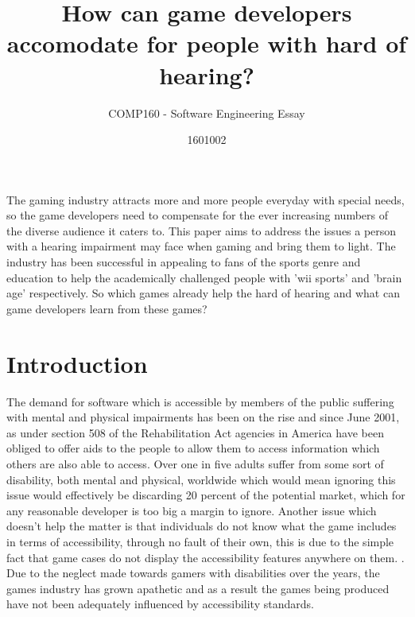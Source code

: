 \documentclass{scrartcl}
\title{How can game developers accomodate for people with hard of hearing?}
\subtitle{COMP160 - Software Engineering Essay}
\author{1601002}
\begin{document}
\maketitle

\abstract
The gaming industry attracts more and more people everyday with special needs, so the game developers need to compensate for the ever increasing numbers of the diverse audience it caters to. This paper aims to address the issues a person with a hearing impairment may face when gaming and bring them to light. The industry has been successful in appealing to fans of the sports genre and education to help the academically challenged people with 'wii sports' and 'brain age' respectively. So which games already help the hard of hearing and what can game developers learn from these games?

\section{Introduction}
The demand for software which is accessible by members of the public suffering with mental and physical impairments has been on the rise and since June 2001, as under section 508 of the Rehabilitation Act \cite{cohen2005accessibility} agencies in America have been obliged to offer aids to the people to allow them to access information which others are also able to access. Over one in five adults suffer from some sort of disability, both mental and physical, worldwide \cite{sierkowski2002achieving} which would mean ignoring this issue would effectively be discarding 20 percent of the potential market, which for any reasonable developer is too big a margin to ignore.  Another issue which doesn't help the matter is that individuals do not know what the game includes in terms of accessibility, through no fault of their own, this is due to the simple fact that game cases do not display the accessibility features anywhere on them. \cite {bierre2005game}. Due to the neglect made towards gamers with disabilities over the years, the games industry has grown apathetic and as a result the games being produced have not been adequately influenced by accessibility standards.\cite{porter2013empirical}
\end{document}
